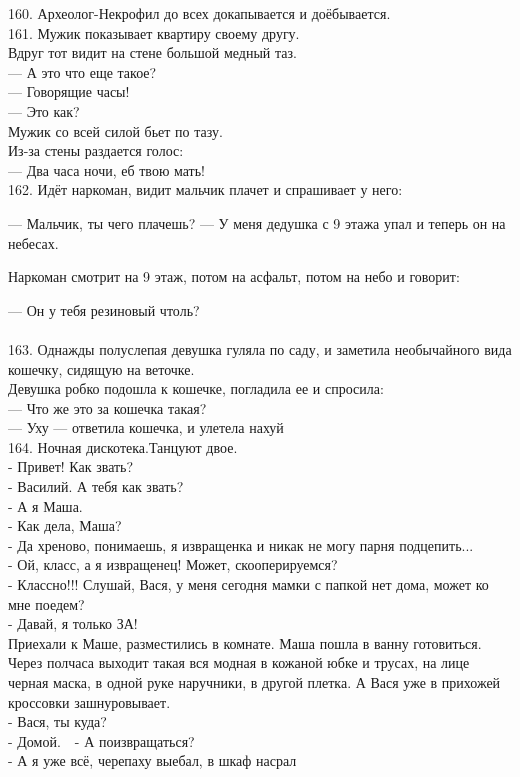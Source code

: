 \documentclass[a4paper,20pt,notitlepage]{extbook}
\begin{document}
	160. Археолог-Некрофил до всех докапывается и доёбывается.\\
	
	161. Мужик показывает квартиру своему другу.\\
	Вдруг тот видит на стене большой медный таз.\\
	— А это что еще такое?\\
	— Говорящие часы!\\
	— Это как?\\
	Мужик со всей силой бьет по тазу.\\
	Из-за стены раздается голос:\\
	— Два часа ночи, еб твою мать!\\
	
	162. Идёт наркоман, видит мальчик плачет и спрашивает у него:
	
	— Мальчик, ты чего плачешь?
	— У меня дедушка с 9 этажа упал и теперь он на небесах.
	
	Наркоман смотрит на 9 этаж, потом на асфальт, потом на небо и говорит:
	
	— Он у тебя резиновый чтоль?\\
	\\
	163. Однажды полуслепая девушка гуляла по саду, и заметила необычайного вида кошечку, сидящую на веточке.\\
	Девушка робко подошла к кошечке, погладила ее и спросила:\\
	— Что же это за кошечка такая?\\
	— Уху — ответила кошечка, и улетела нахуй\\
	
	164. Ночная дискотека.Танцуют двое.\\
	- Привет! Как звать?\\
	- Василий. А тебя как звать?\\
	- А я Маша.\\
	- Как дела, Маша?\\
	- Да хреново, понимаешь, я извращенка и никак не могу парня подцепить...\\
	- Ой, класс, а я извращенец! Может, скооперируемся?\\
	- Классно!!! Слушай, Вася, у меня сегодня мамки с папкой нет дома, может ко мне поедем?\\
	- Давай, я только ЗА!\\
	Приехали к Маше, разместились в комнате. Маша пошла в ванну готовиться. Через полчаса выходит такая вся модная в кожаной юбке и трусах, на лице черная маска, в одной руке наручники, в другой плетка. А Вася уже в прихожей кроссовки зашнуровывает.\\
	- Вася, ты куда?\\
	- Домой.\ \
	- А поизвращаться?\\
	- А я уже всё, черепаху выебал, в шкаф насрал\\
	
\end{document}
